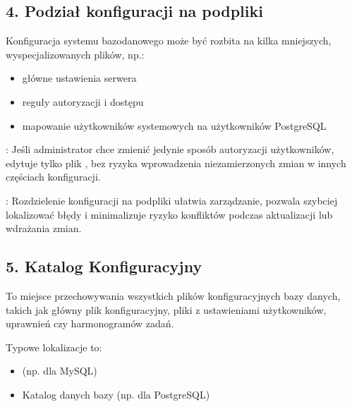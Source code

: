 \documentclass[a4paper,11pt,openany,english]{sphinxmanual}
\begin{document}
\subsection{4. Podział konfiguracji na podpliki}
\label{\detokenize{rozdzial2/Konfiguracja_baz_danych/Konfiguracja_baz_danych:podzial-konfiguracji-na-podpliki}}
\sphinxAtStartPar
Konfiguracja systemu bazodanowego może być rozbita na kilka mniejszych, wyspecjalizowanych plików, np.:
\begin{itemize}
\item {} 
\sphinxAtStartPar
{} \textendash{} główne ustawienia serwera

\item {} 
\sphinxAtStartPar
{} \textendash{} reguły autoryzacji i dostępu

\item {} 
\sphinxAtStartPar
{} \textendash{} mapowanie użytkowników systemowych na użytkowników PostgreSQL

\end{itemize}

\sphinxAtStartPar
{}: Jeśli administrator chce zmienić jedynie sposób autoryzacji użytkowników, edytuje tylko plik , bez ryzyka wprowadzenia niezamierzonych zmian w innych częściach konfiguracji.

\sphinxAtStartPar
{}: Rozdzielenie konfiguracji na podpliki ułatwia zarządzanie, pozwala szybciej lokalizować błędy i minimalizuje ryzyko konfliktów podczas aktualizacji lub wdrażania zmian.


\subsection{5. Katalog Konfiguracyjny}
\label{\detokenize{rozdzial2/Konfiguracja_baz_danych/Konfiguracja_baz_danych:katalog-konfiguracyjny}}
\sphinxAtStartPar
To miejsce przechowywania wszystkich plików konfiguracyjnych bazy danych, takich jak główny plik konfiguracyjny, pliki z ustawieniami użytkowników, uprawnień czy harmonogramów zadań.

\sphinxAtStartPar
Typowe lokalizacje to:
\begin{itemize}
\item {} 
\sphinxAtStartPar
{} (np.  dla MySQL)

\item {} 
\sphinxAtStartPar
Katalog danych bazy (np.  dla PostgreSQL)

\end{itemize}
\end{document}
